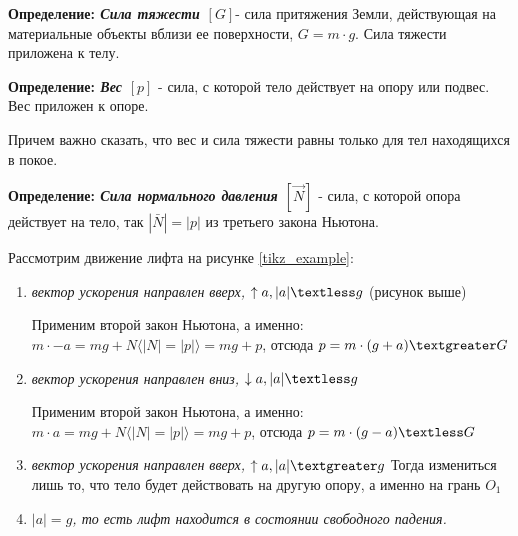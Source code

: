 \documentclass[12pt,a4paper]{report}
\begin{document}
\begin{enumerate}
          \textbf{Определение: \textit{Сила тяжести $[G]$}}- сила притяжения Земли, действующая на материальные объекты вблизи ее поверхности, $G = m \cdot g$. Сила тяжести приложена к телу.

          \textbf{Определение: \textit{Вес $[p]$}} - сила, с которой тело действует на опору или подвес. Вес приложен к опоре.

          Причем важно сказать, что вес и сила тяжести равны только для тел находящихся в покое.

          \textbf{Определение: \textit{Сила нормального давления $[\vec N]$}} - сила, с которой опора действует на тело, так $|\bar N| = | p |$ из третьего закона Ньютона.

          \vspace{5px}

          Рассмотрим движение лифта на рисунке \ref{tikz_example}:
          \begin{enumerate}
              \item \textit{вектор ускорения направлен вверх, $\uparrow a, |a| \textless g$}
                    (рисунок выше)

                    \vspace{5px}

                    Применим второй закон Ньютона, а именно: $m \cdot -a = mg + N \langle |N| = |p| \rangle = mg + p$, отсюда $p = m \cdot (g+a) \textgreater G $
              \item \textit{вектор ускорения направлен вниз, $\downarrow a, |a| \textless g$}

                    \vspace{5px}

                    Применим второй закон Ньютона, а именно: $m \cdot a = mg + N \langle |N| = |p| \rangle = mg + p$, отсюда $p = m \cdot (g-a) \textless G $
              \item \textit{вектор ускорения направлен вверх, $\uparrow a, |a| \textgreater g$}
                    Тогда измениться лишь то, что тело будет действовать на другую опору, а именно на грань $O_1$

                    \vspace{5px}

              \item \textit{$|a| = g$, то есть лифт находится в состоянии свободного падения. }

                    \vspace{5px}


\end{enumerate}
\end{enumerate}
\end{document}
